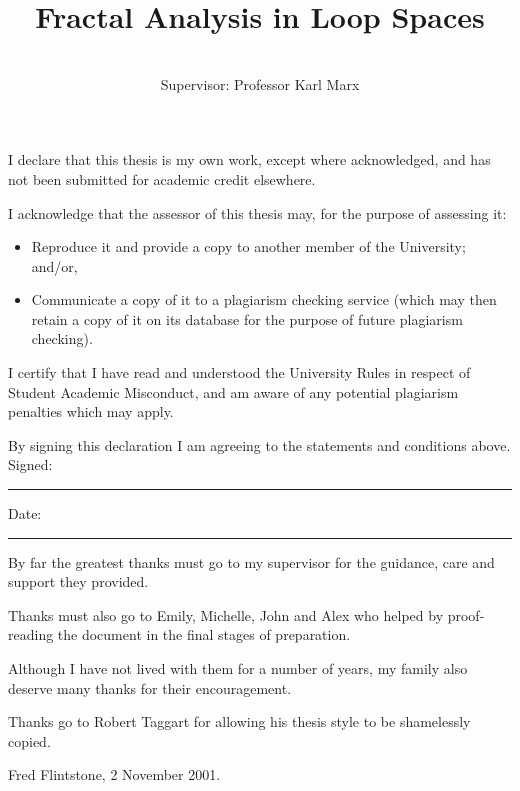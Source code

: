 \documentclass[mmath,12pt]{unswthesis}   %
\title{Fractal Analysis in Loop Spaces}
\author{\Authornameonly\\{\bigskip}Supervisor: Professor Karl Marx}
\newcommand\blankpage{%
    \null
    \thispagestyle{empty}%
    \addtocounter{page}{-1}%
    \newpage}
\numberwithin{equation}{section}
\begin{document}
\beforepreface

\afterpage{\blankpage}



\vskip 10pc \noindent I declare that this thesis is my
own work, except where acknowledged, and has not been submitted for
academic credit elsewhere. 

\vskip 2pc  \noindent I acknowledge that the assessor of this
thesis may, for the purpose of assessing it:
\begin{itemize}
\item Reproduce it and provide a copy to another member of the University; and/or,
\item Communicate a copy of it to a plagiarism checking service (which may then retain a copy of it on its database for the purpose of future plagiarism checking).
\end{itemize}

\vskip 2pc \noindent I certify that I have read and understood the University Rules in
respect of Student Academic Misconduct, and am aware of any potential plagiarism penalties which may 
apply.\vspace{24pt}

\vskip 2pc \noindent By signing 
this declaration I am
agreeing to the statements and conditions above.
\vskip 2pc \noindent
Signed: \rule{7cm}{0.25pt} \hfill Date: \rule{4cm}{0.25pt} \newline
\vskip 1pc

\afterpage{\blankpage}




{\bigskip}By far the greatest thanks must go to my supervisor for
the guidance, care and support they provided. 

{\bigskip\noindent}Thanks 
must also go to Emily, Michelle, John and Alex who helped by
proof-reading the document in the final stages of preparation.

{\bigskip\noindent}Although
I have not lived with them for a number of years, my family also deserve
many thanks for their encouragement.

{\bigskip\noindent} Thanks go to Robert Taggart for allowing his thesis
style to be shamelessly copied.

{\bigskip\bigskip\bigskip\noindent} Fred Flintstone, 2 November 2001.

\afterpage{\blankpage}
\end{document}
